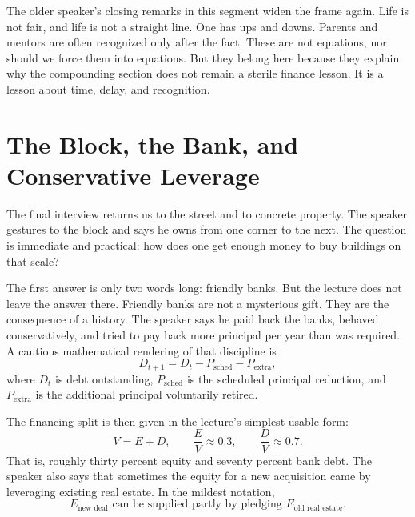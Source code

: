 The older speaker's closing remarks in this segment widen the frame again. Life is not fair, and life is not a straight line. One has ups and downs. Parents and mentors are often recognized only after the fact. These are not equations, nor should we force them into equations. But they belong here because they explain why the compounding section does not remain a sterile finance lesson. It is a lesson about time, delay, and recognition.

\section{The Block, the Bank, and Conservative Leverage}

The final interview returns us to the street and to concrete property. The speaker gestures to the block and says he owns from one corner to the next. The question is immediate and practical: how does one get enough money to buy buildings on that scale?

The first answer is only two words long: friendly banks. But the lecture does not leave the answer there. Friendly banks are not a mysterious gift. They are the consequence of a history. The speaker says he paid back the banks, behaved conservatively, and tried to pay back more principal per year than was required. A cautious mathematical rendering of that discipline is
\begin{equation}
D_{t+1} = D_t - P_{\text{sched}} - P_{\text{extra}},
\end{equation}
where \(D_t\) is debt outstanding, \(P_{\text{sched}}\) is the scheduled principal reduction, and \(P_{\text{extra}}\) is the additional principal voluntarily retired.

The financing split is then given in the lecture's simplest usable form:
\begin{equation}
V = E + D,
\qquad
\frac{E}{V} \approx 0.3,
\qquad
\frac{D}{V} \approx 0.7.
\end{equation}
That is, roughly thirty percent equity and seventy percent bank debt. The speaker also says that sometimes the equity for a new acquisition came by leveraging existing real estate. In the mildest notation,
\begin{equation}
E_{\text{new deal}}
\text{ can be supplied partly by pledging }
E_{\text{old real estate}}.
\end{equation}

